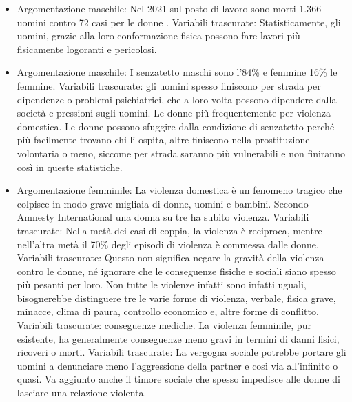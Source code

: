 \documentclass[12pt]{book} %
\begin{document}
\begin{mdframed}[linewidth=1pt]
\begin{itemize}
\item Argomentazione maschile: Nel 2021 sul posto di lavoro sono morti 1.366 uomini contro 72 casi per le donne .
Variabili trascurate: Statisticamente, gli uomini, grazie alla loro conformazione fisica possono fare lavori più fisicamente logoranti e pericolosi. 
\item Argomentazione maschile: I senzatetto maschi sono l'84\% e femmine 16\% le femmine.
Variabili trascurate: gli uomini spesso finiscono per strada per dipendenze o problemi psichiatrici, che a loro volta possono dipendere dalla società e pressioni sugli uomini. Le donne più frequentemente per violenza domestica. Le donne possono sfuggire dalla condizione di senzatetto perché più facilmente trovano chi li ospita, altre finiscono nella prostituzione volontaria o meno, siccome per strada saranno più vulnerabili e non finiranno così in queste statistiche.
\item Argomentazione femminile: La violenza domestica è un fenomeno tragico che colpisce in modo grave migliaia di donne, uomini e bambini. Secondo Amnesty International una donna su tre ha subito violenza. 
Variabili trascurate: Nella metà dei casi di coppia, la violenza è reciproca, mentre nell'altra metà il 70\% degli episodi di violenza è commessa dalle donne. 
Variabili trascurate: Questo non significa negare la gravità della violenza contro le donne, né ignorare che le conseguenze fisiche e sociali siano spesso più pesanti per loro. Non tutte le violenze infatti sono infatti uguali, bisognerebbe distinguere tre le varie forme di violenza, verbale, fisica grave, minacce, clima di paura, controllo economico e, altre forme di conflitto. 
Variabili trascurate: conseguenze mediche. La violenza femminile, pur esistente, ha generalmente conseguenze meno gravi in termini di danni fisici, ricoveri o morti. 
Variabili trascurate: La vergogna sociale potrebbe portare gli uomini a denunciare meno l'aggressione della partner e così via all'infinito o quasi. Va aggiunto anche il timore sociale che spesso impedisce alle donne di lasciare una relazione violenta.

\end{itemize}
\end{mdframed}
\end{document}
